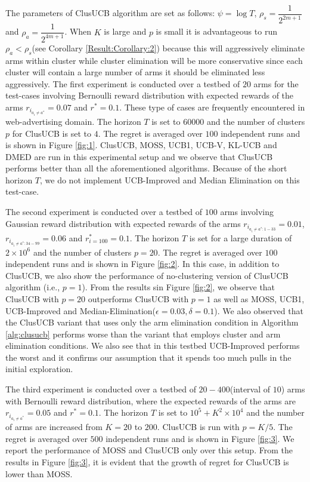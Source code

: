 The parameters of ClusUCB algorithm are set as follows: $\psi=\log T$, $\rho_{s}=\dfrac{1}{2^{2m+1}}$ and $\rho_{a}=\dfrac{1}{2^{4m+1}}$. When $K$ is large and $p$ is small it is advantageous to run $\rho_{a} < \rho_{s}$(see Corollary \ref{Result:Corollary:2}) because this will aggressively eliminate arms within cluster while cluster elimination will be more conservative since each cluster will contain a large number of arms it should be eliminated less aggressively. 
The first experiment is conducted over a testbed of $20$ arms for the test-cases involving Bernoulli reward distribution with expected rewards of the arms $r_{i_{a_{i}\neq a^{*}}}=0.07$ and $r^{*}=0.1$. These type of cases are frequently encountered in web-advertising domain. The horizon $T$ is set to $60000$ and the number of clusters $p$ for ClusUCB is set to $4$. The regret is averaged over $100$ independent runs and is shown in Figure \ref{fig:1}. 
ClusUCB, MOSS, UCB1, UCB-V, KL-UCB and DMED are run in this experimental setup and we observe that ClusUCB performs better than all the aforementioned algorithms. Because of the short horizon $T$, we do not implement UCB-Improved and Median Elimination on this test-case.

The second experiment is conducted over a testbed of $100$ arms involving Gaussian reward distribution with expected rewards of the arms $r_{i_{a_{i}\neq a^{*}:1-33}}=0.01$, $r_{i_{a_{i}\neq a^{*}:34-99}}=0.06$ and $r^{*}_{i=100}=0.1$. The horizon $T$ is set for a large duration of $2\times 10^{6}$ and the number of clusters $p=20$. The regret is averaged over $100$ independent runs and is shown in Figure \ref{fig:2}. In this case, in addition to ClusUCB, we also show the performance of no-clustering version of ClusUCB algorithm (i.e., $p=1$).   From the results sin Figure \ref{fig:2}, we observe that ClusUCB with $p=20$ outperforms ClusUCB with $p=1$ as well as MOSS, UCB1, UCB-Improved and Median-Elimination($\epsilon=0.03,\delta=0.1$). We also observed that the ClusUCB variant that uses only  the arm elimination condition in Algorithm \ref{alg:clusucb} performs worse than the variant that employs cluster and arm elimination conditions. We also see that in this testbed UCB-Improved performs the worst and it confirms our assumption 
that it spends too much pulls in the initial exploration.

The third experiment is conducted over a testbed of $20-400$(interval of $10$) arms with Bernoulli reward distribution, where the expected rewards of the arms are $r_{i_{a_{i}\neq a^{*}}}=0.05$ and $r^{*}=0.1$. The horizon $T$ is set to $10^{5} + K^{2}\times 10^{4}$ and the number of arms are increased from $K=20$ to $200$. ClusUCB is run with $p=K/5$. The regret is averaged over $500$ independent runs and is shown in Figure \ref{fig:3}. We report the performance of MOSS and ClusUCB only over this setup. From the results in Figure \ref{fig:3}, it is evident that the growth of regret for ClusUCB is lower than MOSS. 

